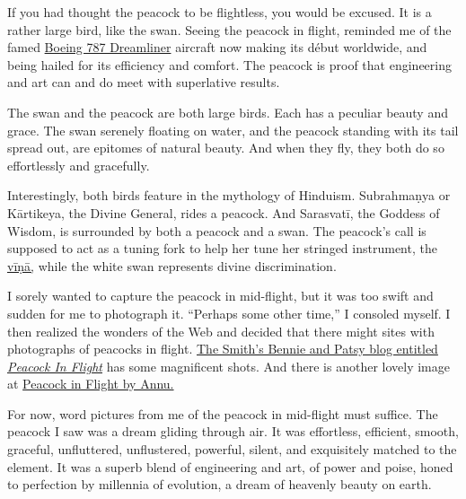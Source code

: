 \documentclass[
  11pt,
  british,
  a4paper,
]{article}
\begin{document}
If you had thought the peacock to be flightless, you would be excused.
It is a rather large bird, like the swan. Seeing the peacock in flight,
reminded me of the famed
\href{http://www.boeing.com/commercial/787family/background.html}{Boeing
787 Dreamliner} aircraft now making its début worldwide, and being
hailed for its efficiency and comfort. The peacock is proof that
engineering and art can and do meet with superlative results.

The swan and the peacock are both large birds. Each has a peculiar
beauty and grace. The swan serenely floating on water, and the peacock
standing with its tail spread out, are epitomes of natural beauty. And
when they fly, they both do so effortlessly and gracefully.

Interestingly, both birds feature in the mythology of Hinduism.
Subrahmaṇya or Kārtikeya, the Divine General, rides a peacock. And
Sarasvatī, the Goddess of Wisdom, is surrounded by both a peacock and a
swan. The peacock's call is supposed to act as a tuning fork to help her
tune her stringed instrument, the
\href{http://www.thefreedictionary.com/vina}{vīṇā,} while the white swan
represents divine discrimination.

I sorely wanted to capture the peacock in mid-flight, but it was too
swift and sudden for me to photograph it. ``Perhaps some other time,'' I
consoled myself. I then realized the wonders of the Web and decided that
there might sites with photographs of peacocks in flight.
\href{http://bennie-thesmiths.blogspot.in/2012/05/peacock-in-flight.html}{The
Smith's Bennie and Patsy blog entitled \emph{Peacock In Flight}} has
some magnificent shots. And there is another lovely image at
\href{http://www.trekearth.com/gallery/Asia/India/West/Rajasthan/Sujangarh/photo772964.htm}{Peacock
in Flight by Annu.}

For now, word pictures from me of the peacock in mid-flight must
suffice. The peacock I saw was a dream gliding through air. It was
effortless, efficient, smooth, graceful, unfluttered, unflustered,
powerful, silent, and exquisitely matched to the element. It was a
superb blend of engineering and art, of power and poise, honed to
perfection by millennia of evolution, a dream of heavenly beauty on
earth.
\end{document}

